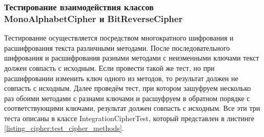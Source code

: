 \documentclass[a4paper,12pt]{article}
\begin{document}
\newpage\subsubsection{Тестирование взаимодействия классов \\MonoAlphabetCipher и BitReverseCipher}
Тестирование осуществляется посредством многократного шифрования и расшифрования текста различными методами. После последовательного шифрования и расшифрования разными методами с неизменными ключами текст должен совпасть с исходным. Если провести такой же тест, но при расшифровании изменить ключ одного из методов, то результат должен не совпасть с исходным. Далее проведём тест, при котором зашуфруем несколько раз обоими методами с разнами ключами и расшуфруем в обратном порядке с соответствующими ключами, результат должен совпасть с исходным. Все эти три теста описаны в классе IntegrationCipherTest, который представлен в листинге \ref{listing_cipher:test_cipher_methods}.
\end{document}
